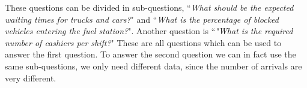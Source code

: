 These questions can be divided in sub-questions, ``\textit{What should be the expected waiting times for trucks and cars?}" and ``\textit{What is the percentage of blocked vehicles entering the fuel station?}".
Another question is ``\textit{"What is the required number of cashiers per shift?}"
These are all questions which can be used to answer the first question.
To answer the second question we can in fact use the same sub-questions, we only need different data, since the number of arrivals are very different.
